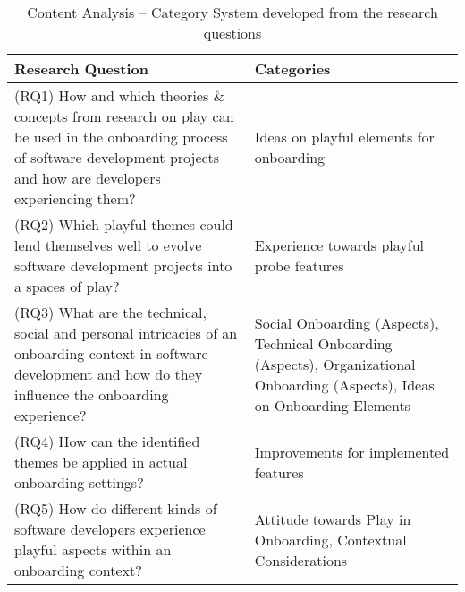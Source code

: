 \begin{table}[h]
  \begin{tabularx}{\textwidth}{| X | X |}
    \hline
    \textbf{Research Question}                                                                                                                                                      & \textbf{Categories}                                                                                                            \\ \hline
    (RQ1) How and which theories \& concepts from research on play can be used in the onboarding process of software development projects and how are developers experiencing them? & Ideas on playful elements for onboarding                                                                                       \\ \hline
    (RQ2) Which playful themes could lend themselves well to evolve software development projects into a spaces of play?                                                            & Experience towards playful probe features                                                                                      \\ \hline
    (RQ3) What are the technical, social and personal intricacies of an onboarding context in software development and how do they influence the onboarding experience?             & Social Onboarding (Aspects), Technical Onboarding (Aspects), Organizational Onboarding (Aspects), Ideas on Onboarding Elements \\ \hline
    (RQ4) How can the identified themes be applied in actual onboarding settings?                                                                                                   & Improvements for implemented features                                                                                          \\ \hline
    (RQ5) How do different kinds of software developers experience playful aspects within an onboarding context?                                                                    & Attitude towards Play in Onboarding, Contextual Considerations                                                                 \\ \hline
  \end{tabularx}
  \caption{\label{tab:qa-categories}Content Analysis -- Category System developed from the research questions}
\end{table}

